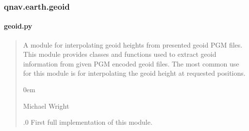 \documentclass[letterpaper,10pt,english]{sphinxmanual}
\begin{document}
\sphinxstepscope


\subsubsection{qnav.earth.geoid}
\label{\detokenize{modules/earth/geoid:qnav-earth-geoid}}\label{\detokenize{modules/earth/geoid::doc}}

\paragraph{geoid.py}
\label{\detokenize{modules/earth/geoid:geoid-py}}\label{\detokenize{modules/earth/geoid:module-qnav.earth.geoid}}\begin{quote}\begin{description}
\sphinxAtStartPar
A module for interpolating geoid heights from presented geoid PGM files.
This module provides classes and functions used to extract geoid
information from given PGM encoded geoid files. The most common use for
this module is for interpolating the geoid height at requested positions.

\begin{DUlineblock}{0em}
\item[] Michael Wright \sphinxhyphen{} 
\end{DUlineblock}

.0 \sphinxhyphen{} First full implementation of this module.

\end{description}\end{quote}
\end{document}
